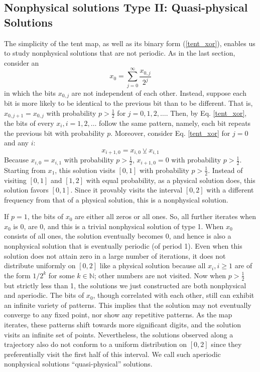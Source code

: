 \subsection{Nonphysical solutions Type II: Quasi-physical Solutions}
\label{sec:quasiphysical}
The simplicity of the tent map, as well as its binary form (\ref{tent_xor}),
enables us to study nonphysical solutions that are not periodic.
As in the last section, consider an
\begin{equation}
    x_0 = \sum_{j=0}^{\infty} \frac{x_{0,j}}{2^j}
\end{equation}
in which the bits $x_{0,j}$ are not independent of each other.  Instead,
suppose each bit is more likely to be identical to the previous bit than to be different.
That is, $x_{0,j+1}=x_{0,j}$ with probability $p>\frac12$ for $j=0,1,2,\ldots$.
Then, by Eq. \ref{tent_xor}, the bits of every $x_i, i=1,2,\ldots$ follow the same pattern, namely, each bit repeats the previous bit
with probability $p$. Moreover, consider Eq. \ref{tent_xor} 
for $j=0$ and any $i$:
\begin{equation}
    x_{i+1,0} = x_{i,0} \veebar x_{i,1}
\end{equation}
Because $x_{i,0}=x_{i,1}$ with probability $p>\frac12$, $x_{i+1,0}=0$ with probability 
$p>\frac12$.  Starting from $x_1$, this solution visits $[0,1]$ with
probability $p>\frac12$.  Instead of visiting $[0,1]$ and $[1,2]$ with
equal probability, as a physical solution does, this solution favors $[0,1]$. Since it provably visits the interval $[0,2]$ with a different frequency from that
of a physical solution, this is a nonphysical solution.

If $p = 1$, the bits of $x_0$ are either all zeros or all ones. So, all further iterates when $x_0$ is 0, are 0, and this is a trivial nonphysical solution of type 1. When $x_0$ consists of all ones, the solution eventually becomes 0, and hence is also a nonphysical solution that is eventually periodic (of period 1). Even when this solution does not attain zero in a large number of iterations, it does not 
distribute uniformly on $[0,2]$ like a physical solution 
because all $x_i, i\geq 1$ are of the form $1/2^k$ for some $k \in \mathbb{N}$; other numbers are not visited. Now when $p > \frac12$ but strictly less than 1, 
the solutions we just constructed are both nonphysical and aperiodic.
The bits of $x_0$, though correlated with each other,
still can exhibit an infinite variety of patterns. 
This implies that the solution may not eventually converge to 
any fixed point, nor show any repetitive patterns.  
 As the map iterates, these patterns
shift towards more significant digits, and the solution visits an infinite set of
points. 
 Nevertheless, the solutions observed along a trajectory also 
 do not conform to a uniform distribution on $[0,2]$ since they 
 preferentially visit the first half of this interval.
We call such aperiodic nonphysical solutions ``quasi-physical'' solutions.

